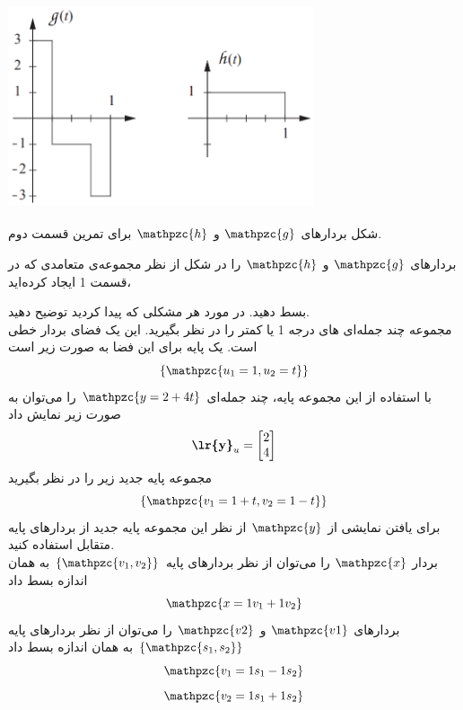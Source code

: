 \documentclass[a4paper,12pt]{report}
\begin{document}
	 \begin{center}
	 	\hspace{-2cm}\includegraphics[width=9cm, height=6cm]{152}
	 	
	 شکل  بردارهای $ \mathpzc{g} $ و $ \mathpzc{h} $ برای تمرین  قسمت دوم.	 
	 \end{center}
 
 	 \textbf{}
 بردارهای $ \mathpzc{g} $ و $ \mathpzc{h} $ را در شکل  از نظر مجموعه‌ی متعامدی که در قسمت 1 ایجاد کرده‌اید،
 
 \hspace{0.4cm}
  بسط دهید. در مورد هر مشکلی که پیدا کردید توضیح دهید.\\
 
 \hspace{-2.5cm}\textbf{}\hspace{0.6cm}
مجموعه چند جمله‌ای های درجه 1 یا کمتر را در نظر بگیرید. این یک فضای بردار خطی است. یک پایه برای این فضا به صورت زیر است
	 $$
	 \{\mathpzc{u_1=1,u_2=t}\}
	 $$
	 با استفاده از این مجموعه پایه، چند جمله‌ای $ \mathpzc{y = 2 + 4t} $ را می‌توان به صورت زیر نمایش داد
	 $$
	 \textbf{\lr{y}}_u=
	 \begin{bmatrix}
	 	2 \\ 4
	 \end{bmatrix}
	 $$
	 مجموعه پایه جدید زیر را در نظر بگیرید
	 $$
	 \{\mathpzc{v_1=1+t, v_2=1-t}\}
	 $$
	 برای یافتن نمایشی از $ \mathpzc{y} $ از نظر این مجموعه پایه جدید  از بردارهای پایه متقابل استفاده کنید.\\
	 
	 \hspace{-2.5cm}\textbf{}\hspace{0.6cm}
	 بردار $ \mathpzc{x} $ را می‌توان از نظر بردارهای پایه 
	 $ \{\mathpzc{v_1,v_2}\} $
	  به همان اندازه بسط داد
	  $$
	  \mathpzc{x=1v_1+1v_2}
	  $$
	  بردارهای $ \mathpzc{v1} $ و $ \mathpzc{v2} $ را می‌توان از نظر بردارهای پایه 
	  $ \{\mathpzc{s_1,s_2}\} $
	   به همان اندازه بسط داد
	   $$
	   \mathpzc{v_1=1s_1-1s_2}
	   $$
	   \vspace{-1.2cm}
	   $$
	   \mathpzc{v_2=1s_1+1s_2}
	   $$
	   
\end{document}
